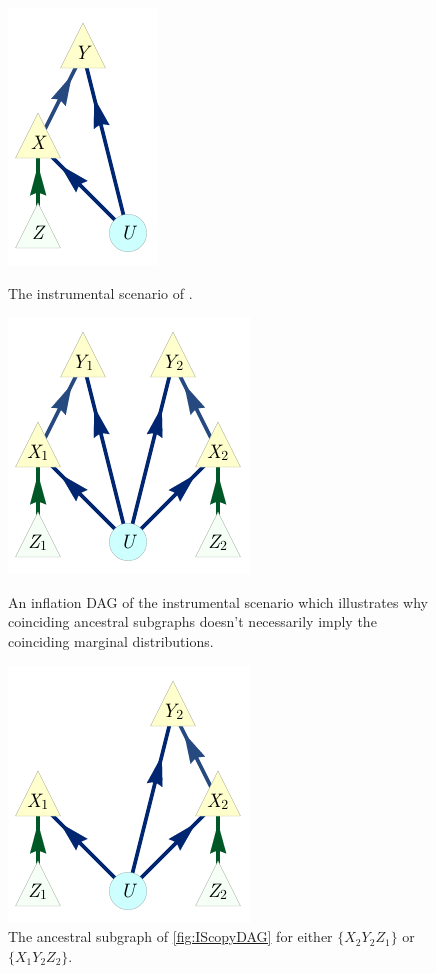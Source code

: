 \begin{figure}[b]
    \centering
    \begin{minipage}[t]{0.2\linewidth}      \centering
    \includegraphics[scale=1]{ISorigDAG.pdf}
    \caption{The instrumental scenario of \citet{pearl1995instrumental}.}
    \label{fig:ISorigDAG}
    \end{minipage}\hfill
    \begin{minipage}[t]{0.3\linewidth}      \centering
    \includegraphics[scale=1]{IScopyDAG.pdf}
    \caption{An inflation DAG of the instrumental scenario which illustrates why coinciding ancestral subgraphs doesn't necessarily imply the coinciding marginal distributions.}
    \label{fig:IScopyDAG}
    \end{minipage}\hfill    
    \begin{minipage}[t]{0.3\linewidth}      \centering
    \includegraphics[scale=1]{ISancestorDAG.pdf}
    \caption{The ancestral subgraph of \cref{fig:IScopyDAG} for either $\{X_2 Y_2 Z_1\}$ or $\{X_1 Y_2 Z_2\}$.}
    \label{fig:ancestralsubgraphnotenough}
    \end{minipage}
\end{figure}


